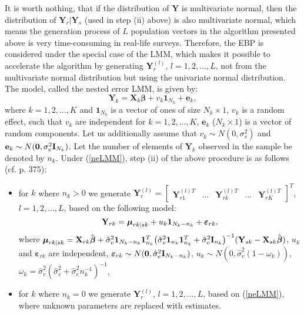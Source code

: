 It is worth nothing, that if the distribution of $\mathbf{Y}$ is multivariate normal, then the distribution of $\mathbf{Y}_r|\mathbf{Y}_s$ (used in step (ii) above) is also multivariate normal, which means the generation process of $L$ population vectors in the algorithm presented above is very time-consuming in real-life surveys. Therefore, the EBP is considered under the special case of the LMM, which makes it possible to accelerate the algorithm by generating $\mathbf{Y}_r^{(l)}$, $l=1, 2, ...,L$, not from the multivariate normal distribution but using the univariate normal distribution. The model, called the nested error LMM, is given by:
\begin{equation} \label{neLMM}
	\mathbf{Y}_k=\mathbf{X}_k\boldsymbol{\beta} + v_k \mathbf{1}_{N_k} +\mathbf{e}_k,
\end{equation}
where $k=1,2,...,K$ and $\mathbf{1}_{N_k}$ is a vector of ones of size $N_k \times 1$,  $v_{k}$ is a random effect, such that $v_{k}$ are independent for $k=1, 2, ..., K$,  $\mathbf{e}_{k}$ ($N_k \times 1$) is a vector of random components. Let us additionally assume that  $v_k \sim N(0,\sigma^2_v)$ and $\mathbf{e}_{k} \sim N({\bf{0}},\sigma_e^2{{\bf{I}}_{N_k}})$. Let the number of elements of $\mathbf{Y}_k$ observed in the sample be denoted by $n_k$. Under (\ref{neLMM}), step (ii) of the above procedure is as follows (cf. \cite{molina2010small} p. 375):
\begin{itemize}
	\item for $k$ where $n_k>0$  we generate $\mathbf{Y}_r^{(l)}=\begin{bmatrix}
		\mathbf{Y}_{r1}^{(l)T} & ...& \mathbf{Y}_{rk}^{(l)T} & ... & \mathbf{Y}_{rK}^{(l)T}
	\end{bmatrix}^T$, $l=1, 2, ...,L$, based on the following model:
	\begin{equation}\label{codnorm_k3}
		{{\bf{Y}}_{rk}} = {{\boldsymbol{\mu }}_{rk|sk}} + {u_k}{{\bf{1}}_{{N_k} - {n_k}}} + {{\boldsymbol{\varepsilon }}_{rk}},
	\end{equation}
	where ${{\boldsymbol{\mu }}_{rk|sk}} = {{\bf{X}}_{rk}}{\hat{\boldsymbol{\beta}} } + \hat{\sigma}_v^2{{\bf{1}}_{{N_k} - {n_k}}}{\bf{1}}_{{n_k}}^T{\left( {\hat{\sigma}_v^2{{\bf{1}}_{{n_k}}}{\bf{1}}_{{n_k}}^T + \hat{\sigma}_e^2{{\bf{I}}_{{n_k}}}} \right)^{ - 1}}({{\bf{Y}}_{sk}} - {{\bf{X}}_{sk}}{{\hat{\boldsymbol{\beta}} }})$, ${u_k}$ and ${{\boldsymbol{\varepsilon }}_{rk}}$ are independent, ${{\boldsymbol{\varepsilon }}_{rk}}\sim N({\bf{0}},\hat{\sigma}_e^2{{\bf{I}}_{{N_k} - {n_k}}})$, ${u_k}\sim N(0,\hat{\sigma}_v^2(1-{\omega_k}))$, ${\omega_k} = \hat{\sigma}_v^2{(\hat{\sigma}_v^2 + \hat{\sigma}_e^2 n_k^{ - 1})^{ - 1}}$,
	\item for $k$ where $n_k=0$  we generate $\mathbf{Y}_r^{(l)}$, $l=1, 2, ...,L$, based on (\ref{neLMM}), where unknown parameters are replaced with estimates.
\end{itemize}


